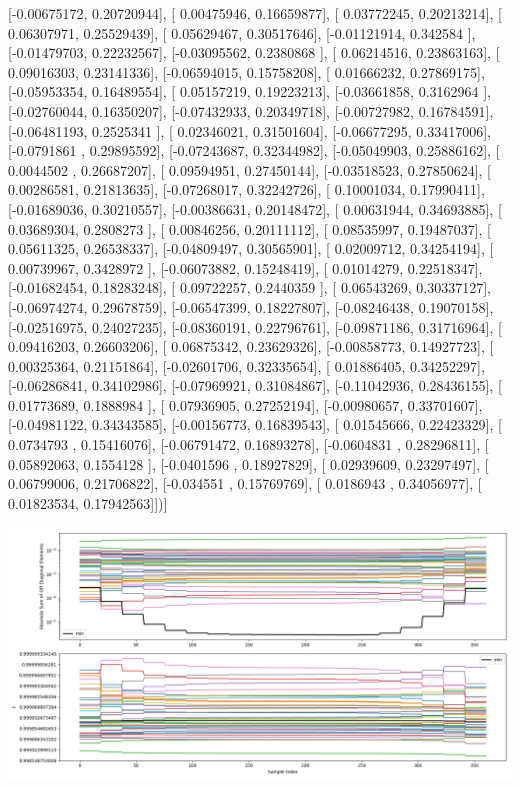 \documentclass{article}
\begin{document}
       [-0.00675172,  0.20720944],
       [ 0.00475946,  0.16659877],
       [ 0.03772245,  0.20213214],
       [ 0.06307971,  0.25529439],
       [ 0.05629467,  0.30517646],
       [-0.01121914,  0.342584  ],
       [-0.01479703,  0.22232567],
       [-0.03095562,  0.2380868 ],
       [ 0.06214516,  0.23863163],
       [ 0.09016303,  0.23141336],
       [-0.06594015,  0.15758208],
       [ 0.01666232,  0.27869175],
       [-0.05953354,  0.16489554],
       [ 0.05157219,  0.19223213],
       [-0.03661858,  0.3162964 ],
       [-0.02760044,  0.16350207],
       [-0.07432933,  0.20349718],
       [-0.00727982,  0.16784591],
       [-0.06481193,  0.2525341 ],
       [ 0.02346021,  0.31501604],
       [-0.06677295,  0.33417006],
       [-0.0791861 ,  0.29895592],
       [-0.07243687,  0.32344982],
       [-0.05049903,  0.25886162],
       [ 0.0044502 ,  0.26687207],
       [ 0.09594951,  0.27450144],
       [-0.03518523,  0.27850624],
       [ 0.00286581,  0.21813635],
       [-0.07268017,  0.32242726],
       [ 0.10001034,  0.17990411],
       [-0.01689036,  0.30210557],
       [-0.00386631,  0.20148472],
       [ 0.00631944,  0.34693885],
       [ 0.03689304,  0.2808273 ],
       [ 0.00846256,  0.20111112],
       [ 0.08535997,  0.19487037],
       [ 0.05611325,  0.26538337],
       [-0.04809497,  0.30565901],
       [ 0.02009712,  0.34254194],
       [ 0.00739967,  0.3428972 ],
       [-0.06073882,  0.15248419],
       [ 0.01014279,  0.22518347],
       [-0.01682454,  0.18283248],
       [ 0.09722257,  0.2440359 ],
       [ 0.06543269,  0.30337127],
       [-0.06974274,  0.29678759],
       [-0.06547399,  0.18227807],
       [-0.08246438,  0.19070158],
       [-0.02516975,  0.24027235],
       [-0.08360191,  0.22796761],
       [-0.09871186,  0.31716964],
       [ 0.09416203,  0.26603206],
       [ 0.06875342,  0.23629326],
       [-0.00858773,  0.14927723],
       [ 0.00325364,  0.21151864],
       [-0.02601706,  0.32335654],
       [ 0.01886405,  0.34252297],
       [-0.06286841,  0.34102986],
       [-0.07969921,  0.31084867],
       [-0.11042936,  0.28436155],
       [ 0.01773689,  0.1888984 ],
       [ 0.07936905,  0.27252194],
       [-0.00980657,  0.33701607],
       [-0.04981122,  0.34343585],
       [-0.00156773,  0.16839543],
       [ 0.01545666,  0.22423329],
       [ 0.0734793 ,  0.15416076],
       [-0.06791472,  0.16893278],
       [-0.0604831 ,  0.28296811],
       [ 0.05892063,  0.1554128 ],
       [-0.0401596 ,  0.18927829],
       [ 0.02939609,  0.23297497],
       [ 0.06799006,  0.21706822],
       [-0.034551  ,  0.15769769],
       [ 0.0186943 ,  0.34056977],
       [ 0.01823534,  0.17942563]])]
\begin{center}
\includegraphics[scale=.9]{report_pickled_controls236/control_dpn_all.png}

\end{center}
\end{document}
